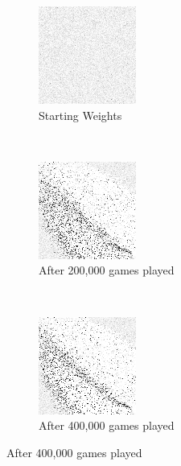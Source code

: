 
\begin{figure}
\center

	\begin{subfigure}[t]{0.3\textwidth}
	\centering
	\includegraphics[width=\stratgraphwidth]{images/findings/round1/flipbook_a.png}
	\caption{Starting Weights}
	\end{subfigure}
	~
	\begin{subfigure}[t]{0.3\textwidth}
	\centering
	\includegraphics[width=\stratgraphwidth]{images/findings/round1/flipbook_b.png}
	\caption{After 200,000 games played}
	\end{subfigure}
	~
	\begin{subfigure}[t]{0.3\textwidth}
	\centering
	\includegraphics[width=\stratgraphwidth]{images/findings/round1/flipbook_c.png}
	\caption{After 400,000 games played}
	\end{subfigure}


\end{figure}
